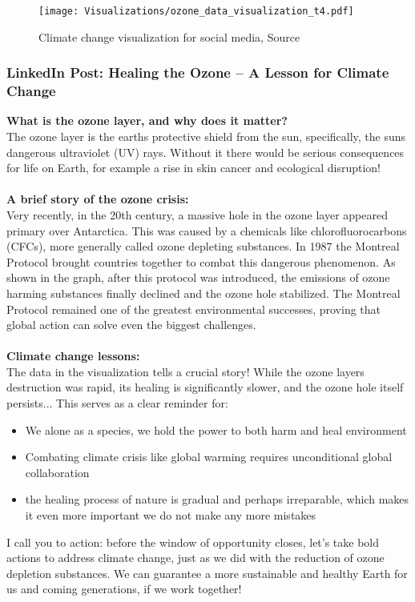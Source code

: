 \documentclass[a4paper,landscape]{article}
\begin{document}
\begin{figure}[H]
    \centering
    \texttt{[image: Visualizations/ozone\_data\_visualization\_t4.pdf]} %
    \caption{Climate change visualization for social media, Source \cite{nasa2024ozone}}
    \label{fig:climate}
\end{figure}

\subsubsection{LinkedIn Post: Healing the Ozone – A Lesson for Climate Change}

\textbf{What is the ozone layer, and why does it matter?}  \\
The ozone layer is the earths protective shield from the sun, specifically, the suns dangerous ultraviolet (UV) rays. Without it there would be serious consequences for life on Earth, for example a rise in skin cancer and ecological disruption!
 \\ \\ 
\textbf{A brief story of the ozone crisis:} \\
Very recently, in the 20th century, a massive hole in the ozone layer appeared primary over Antarctica. This was caused by a chemicals like chlorofluorocarbons (CFCs), more generally called ozone depleting substances. In 1987 the Montreal Protocol brought countries together to combat this dangerous phenomenon. 
As shown in the graph, after this protocol was introduced, the emissions of ozone harming substances finally declined and the ozone hole stabilized. 
The Montreal Protocol remained one of the greatest environmental successes, proving that global action can solve even the biggest challenges.
\\ \\
\textbf{Climate change lessons:} \\
The data in the visualization tells a crucial story! While the ozone layers destruction was rapid, its healing is significantly slower, and the ozone hole itself persists... This serves as a clear reminder for:
\begin{itemize}
    \item We alone as a species, we hold the power to both harm and heal environment
    \item Combating climate crisis like global warming requires unconditional global collaboration
    \item the healing process of nature is gradual and perhaps irreparable, which makes it even more important we do not make any more mistakes
\end{itemize}
 I call you to action: before the window of opportunity closes, let's take bold actions to address climate change, just as we did with the reduction of ozone depletion substances. We can guarantee a more sustainable and healthy Earth for us and coming generations, if we work together!
\end{document}
